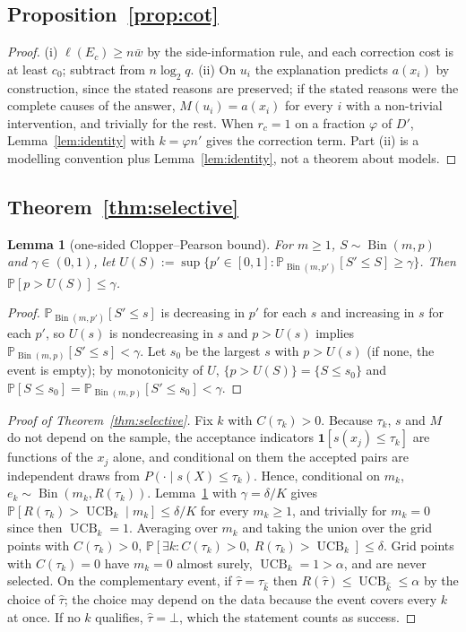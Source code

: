 \documentclass[11pt,letterpaper]{article}
\newcommand{\D}{D}
\renewcommand{\Pr}{\mathbb{P}}
\newcommand{\ind}[1]{\mathbf{1}[#1]}
\DeclareMathOperator{\UCB}{UCB}
\DeclareMathOperator{\Bin}{Bin}
\newcommand{\cz}{c_{0}}
\newcommand{\tauhat}{\hat{\tau}}
\newcommand{\Ltwo}{\log_{2}}
\theoremstyle{plain}
\newtheorem{lemma}{Lemma}
\theoremstyle{definition}
\theoremstyle{remark}
\begin{document}
\subsection{Proposition~\ref{prop:cot}}
\begin{proof}
(i) $\ell(E_c)\ge n\bar w$ by the side-information rule, and each correction cost is at least $\cz$; subtract from $n\Ltwo q$. (ii) On $u_i$ the explanation predicts $a(x_i)$ by construction, since the stated reasons are preserved; if the stated reasons were the complete causes of the answer, $M(u_i)=a(x_i)$ for every $i$ with a non-trivial intervention, and trivially for the rest. When $r_c=1$ on a fraction $\varphi$ of $\D'$, Lemma~\ref{lem:identity} with $k=\varphi n'$ gives the correction term. Part (ii) is a modelling convention plus Lemma~\ref{lem:identity}, not a theorem about models.
\end{proof}

\subsection{Theorem~\ref{thm:selective}}

\begin{lemma}[one-sided Clopper--Pearson bound]
\label{lem:cp}
For $m\ge1$, $S\sim\Bin(m,p)$ and $\gamma\in(0,1)$, let $U(S):=\sup\{p'\in[0,1]:\Pr_{\Bin(m,p')}[S'\le S]\ge\gamma\}$. Then $\Pr[p>U(S)]\le\gamma$.
\end{lemma}
\begin{proof}
$\Pr_{\Bin(m,p')}[S'\le s]$ is decreasing in $p'$ for each $s$ and increasing in $s$ for each $p'$, so $U(s)$ is nondecreasing in $s$ and $p>U(s)$ implies $\Pr_{\Bin(m,p)}[S'\le s]<\gamma$. Let $s_0$ be the largest $s$ with $p>U(s)$ (if none, the event is empty); by monotonicity of $U$, $\{p>U(S)\}=\{S\le s_0\}$ and $\Pr[S\le s_0]=\Pr_{\Bin(m,p)}[S'\le s_0]<\gamma$.
\end{proof}

\begin{proof}[Proof of Theorem~\ref{thm:selective}]
Fix $k$ with $C(\tau_k)>0$. Because $\tau_k$, $s$ and $M$ do not depend on the sample, the acceptance indicators $\ind{s(x_j)\le\tau_k}$ are functions of the $x_j$ alone, and conditional on them the accepted pairs are independent draws from $P(\cdot\mid s(X)\le\tau_k)$. Hence, conditional on $m_k$, $e_k\sim\Bin(m_k,R(\tau_k))$. Lemma~\ref{lem:cp} with $\gamma=\delta/K$ gives $\Pr[R(\tau_k)>\UCB_k\mid m_k]\le\delta/K$ for every $m_k\ge1$, and trivially for $m_k=0$ since then $\UCB_k=1$. Averaging over $m_k$ and taking the union over the grid points with $C(\tau_k)>0$, $\Pr[\exists k:C(\tau_k)>0,\ R(\tau_k)>\UCB_k]\le\delta$. Grid points with $C(\tau_k)=0$ have $m_k=0$ almost surely, $\UCB_k=1>\alpha$, and are never selected. On the complementary event, if $\tauhat=\tau_{\hat k}$ then $R(\tauhat)\le\UCB_{\hat k}\le\alpha$ by the choice of $\tauhat$; the choice may depend on the data because the event covers every $k$ at once. If no $k$ qualifies, $\tauhat=\bot$, which the statement counts as success.
\end{proof}
\end{document}
